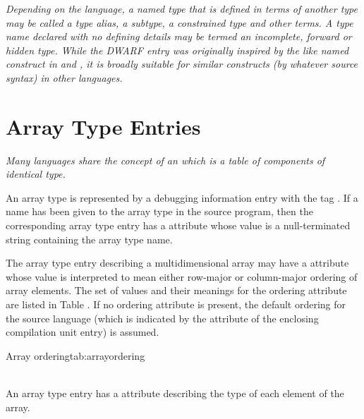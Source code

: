 \textit{Depending on the language, a named type that is defined in
terms of another type may be called a type alias, a subtype,
a constrained type and other terms. A type name declared with
no defining details may be termed an 
incomplete, forward or hidden type. 
While the DWARF \DWTAGtypedef{} entry was
originally inspired by the like named construct in 
 and ,
it is broadly suitable for similar constructs (by whatever
source syntax) in other languages.}

\section{Array Type Entries}
\label{chap:arraytypeentries}
\label{chap:DWTAGgenericsubrange}

\textit{Many languages share the concept of an  which is
a table of components of identical type.}

An array type is represented by a debugging information entry
with the tag \DWTAGarraytypeTARG. 
If a name has been given to
the array type in the source program, then the corresponding
array type entry has a \DWATname{} attribute 
whose value is a
null-terminated string containing the array type name.
\bbeb

The\hypertarget{chap:DWATorderingarrayrowcolumnordering}{}
array type entry describing a multidimensional array may
have a \DWATorderingDEFN{} attribute whose 
 value is
interpreted to mean either row-major or column-major ordering
of array elements. The set of values and their meanings
for the ordering attribute are listed in 
Table . 
If no
ordering attribute is present, the default ordering for the
source language (which is indicated by the 
\DWATlanguage{}
attribute 
of the enclosing compilation unit entry) is assumed.

\begin{simplenametable}[1.8in]{Array ordering}{tab:arrayordering}
\DWORDcolmajorTARG{} \\
\DWORDrowmajorTARG{} \\
\end{simplenametable}

\bbpareb

An array type entry has 
a \DWATtype{} attribute
describing
the type of each element of the array.

